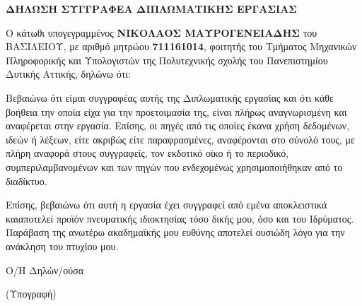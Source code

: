 \clearpage

\begin{center}

\vspace*{2cm}

{\Large \textbf{ΔΗΛΩΣΗ ΣΥΓΓΡΑΦΕΑ ΔΙΠΛΩΜΑΤΙΚΗΣ ΕΡΓΑΣΙΑΣ}}

\end{center}

\vspace{1cm}

Ο κάτωθι υπογεγραμμένος \textbf{ΝΙΚΟΛΑΟΣ ΜΑΥΡΟΓΕΝΕΙΑΔΗΣ} του ΒΑΣΙΛΕΙΟΥ, 
με αριθμό μητρώου \textbf{711161014}, φοιτητής του Τμήματος Μηχανικών Πληροφορικής 
και Υπολογιστών της Πολυτεχνικής σχολής του Πανεπιστημίου Δυτικής Αττικής, δηλώνω ότι:

\vspace{0.5cm}

Βεβαιώνω ότι είμαι συγγραφέας αυτής της Διπλωματικής εργασίας και ότι κάθε βοήθεια την οποία
είχα για την προετοιμασία της, είναι πλήρως αναγνωρισμένη και αναφέρεται στην εργασία.
Επίσης, οι πηγές από τις οποίες έκανα χρήση δεδομένων, ιδεών ή λέξεων, είτε ακριβώς είτε
παραφρασμένες, αναφέρονται στο σύνολό τους, με πλήρη αναφορά στους συγγραφείς, τον
εκδοτικό οίκο ή το περιοδικό, συμπεριλαμβανομένων και των πηγών που ενδεχομένως χρησιμοποιήθηκαν από το διαδίκτυο.

\vspace{0.5cm}

Επίσης, βεβαιώνω ότι αυτή η εργασία έχει συγγραφεί από εμένα αποκλειστικά καιαποτελεί προϊόν πνευματικής ιδιοκτησίας τόσο δικής μου, όσο και του Ιδρύματος. Παράβαση της ανωτέρω ακαδημαϊκής μου ευθύνης αποτελεί ουσιώδη λόγο για την ανάκληση του πτυχίου μου.

\vspace{2cm}

\begin{center}
Ο/Η Δηλών/ούσα
\end{center}

\vspace{0.25cm}

\begin{center}
(Υπογραφή)
\end{center}

\clearpage